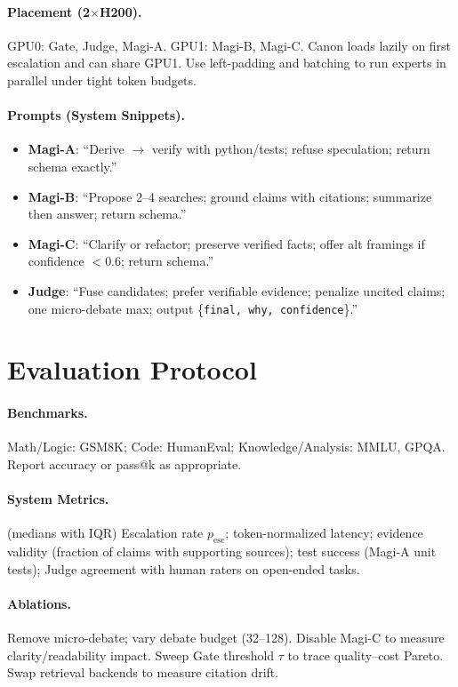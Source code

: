 \documentclass[11pt]{article}
\begin{document}
\paragraph{Placement (2$\times$H200).} GPU0: Gate, Judge, Magi-A. GPU1: Magi-B, Magi-C. Canon loads lazily on first escalation and can share GPU1. Use left-padding and batching to run experts in parallel under tight token budgets.

\paragraph{Prompts (System Snippets).}
\begin{itemize}[leftmargin=*, itemsep=2pt]
  \item \textbf{Magi-A}: ``Derive $\rightarrow$ verify with python/tests; refuse speculation; return schema exactly.''
  \item \textbf{Magi-B}: ``Propose 2--4 searches; ground claims with citations; summarize then answer; return schema.''
  \item \textbf{Magi-C}: ``Clarify or refactor; preserve verified facts; offer alt framings if confidence $<0.6$; return schema.''
  \item \textbf{Judge}: ``Fuse candidates; prefer verifiable evidence; penalize uncited claims; one micro-debate max; output \{\texttt{final, why, confidence}\}.''
\end{itemize}

\section{Evaluation Protocol}
\paragraph{Benchmarks.} Math/Logic: GSM8K; Code: HumanEval; Knowledge/Analysis: MMLU, GPQA. Report accuracy or pass@k as appropriate.

\paragraph{System Metrics.} (medians with IQR) Escalation rate $p_{\text{esc}}$; token-normalized latency; evidence validity (fraction of claims with supporting sources); test success (Magi-A unit tests); Judge agreement with human raters on open-ended tasks.

\paragraph{Ablations.} Remove micro-debate; vary debate budget (32--128). Disable Magi-C to measure clarity/readability impact. Sweep Gate threshold $\tau$ to trace quality--cost Pareto. Swap retrieval backends to measure citation drift.
\end{document}
